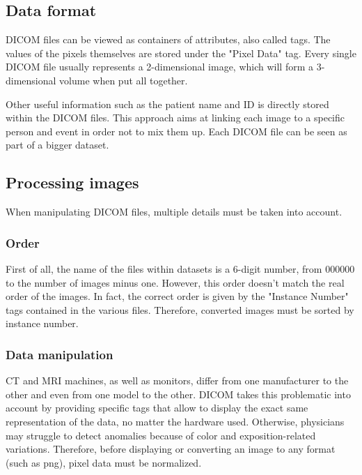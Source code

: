 \subsection{Data format}
\setlength{\marginparwidth}{3cm}\leavevmode {}DICOM files can be viewed as containers of attributes, also called tags. The values of the pixels themselves are stored under the "Pixel Data" tag. Every single DICOM file usually represents a 2-dimensional image, which will form a 3-dimensional volume when put all together. 

Other useful information such as the patient name and ID is directly stored within the DICOM files. This approach aims at linking each image to a specific person and event in order not to mix them up. Each DICOM file can be seen as part of a bigger dataset. 


\subsection{Processing images}
\setlength{\marginparwidth}{3cm}\leavevmode {}When manipulating DICOM files, multiple details must be taken into account. 


\subsubsection{Order}
\setlength{\marginparwidth}{3cm}\leavevmode {}First of all, the name of the files within datasets is a 6-digit number, from 000000 to the number of images minus one. However, this order doesn’t match the real order of the images. In fact, the correct order is given by the "Instance Number" tags contained in the various files. Therefore, converted images must be sorted by instance number. 


\subsubsection{Data manipulation}
\label{sec:dicom_data_manipulation}
\setlength{\marginparwidth}{3cm}\leavevmode {}CT and MRI machines, as well as monitors, differ from one manufacturer to the other and even from one model to the other. DICOM takes this problematic into account by providing specific tags that allow to display the exact same representation of the data, no matter the hardware used. Otherwise, physicians may struggle to detect anomalies because of color and exposition-related variations. 
Therefore, before displaying or converting an image to any format (such as png), pixel data must be normalized. 

